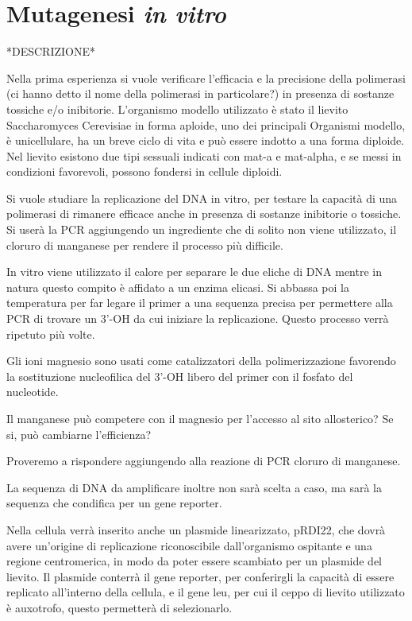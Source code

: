 \section*{Mutagenesi \emph{in vitro}}

*DESCRIZIONE*

        Nella prima esperienza si vuole verificare l'efficacia e la precisione della polimerasi (ci hanno detto il nome della polimerasi in particolare?)
        in presenza di sostanze tossiche e/o inibitorie.
        L'organismo modello utilizzato è stato il lievito Saccharomyces Cerevisiae in forma aploide, uno dei principali Organismi modello, è unicellulare, ha un breve ciclo
        di vita e può essere indotto a una forma diploide. 
        Nel lievito esistono due tipi sessuali indicati con mat-a e mat-alpha, e se messi in condizioni favorevoli, possono fondersi in cellule diploidi.

        Si vuole studiare la replicazione del DNA in vitro, per testare la capacità di una polimerasi di rimanere efficace anche in presenza di sostanze inibitorie o tossiche.
        Si userà la PCR aggiungendo un ingrediente che di solito non viene utilizzato, il cloruro di manganese per rendere il processo più difficile.

        In vitro viene utilizzato il calore per separare le due eliche di DNA mentre in natura questo compito è affidato a un enzima elicasi. 
        Si abbassa poi la temperatura per far legare il primer a una sequenza precisa per permettere alla PCR di trovare un 3'-OH da cui iniziare la replicazione.
        Questo processo verrà ripetuto più volte.

        Gli ioni magnesio sono usati come catalizzatori della polimerizzazione favorendo la sostituzione nucleofilica del 3'-OH libero del primer con il fosfato del nucleotide.
        
        Il manganese può competere con il magnesio per l'accesso al sito allosterico? Se si, può cambiarne l'efficienza?

        Proveremo a rispondere aggiungendo alla reazione di PCR cloruro di manganese.

        La sequenza di DNA da amplificare inoltre non sarà scelta a caso, ma sarà la sequenza che condifica per un gene reporter.

        Nella cellula verrà inserito anche un plasmide linearizzato, pRDI22, che dovrà avere un'origine di replicazione riconoscibile dall'organismo ospitante e una regione
        centromerica, in modo da poter essere scambiato per un plasmide del lievito.
        Il plasmide conterrà il gene reporter, per conferirgli la capacità di essere replicato all'interno della cellula, e il gene leu, per cui il ceppo di lievito utilizzato
        è auxotrofo, questo permetterà di selezionarlo.


